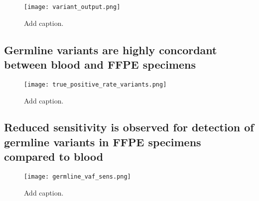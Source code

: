 \documentclass{bmcart}
\begin{document}
\begin{figure}[!h]
\centering
	\texttt{[image: variant\_output.png]}
	\caption{Add caption.}
	\label{fig:variant_output}
\end{figure}

\subsection*{Germline variants are highly concordant between blood and FFPE specimens}

\begin{figure}[!h]
\centering
	\texttt{[image: true\_positive\_rate\_variants.png]}
	\caption{Add caption.}
	\label{fig:true_positive_rate_variants}
\end{figure}

\subsection*{Reduced sensitivity is observed for detection of germline variants in FFPE specimens compared to blood}

\begin{figure}[!h]
	\texttt{[image: germline\_vaf\_sens.png]}
	\caption{Add caption.}
	\label{fig:germline_vaf_sens}
\end{figure}
\end{document}
